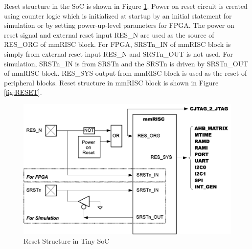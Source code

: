 Reset structure in the SoC is shown in Figure \ref{fig:RESETSOC}. Power on reset circuit is created using counter logic which is initialized at startup by an initial statement for simulation or by setting power-up-level parameters for FPGA. The power on reset signal and external reset input RES\_N are used as the source of RES\_ORG of mmRISC block. For FPGA, SRSTn\_IN of mmRISC block is simply from external reset input RES\_N and SRSTn\_OUT is not used. For simulation, SRSTn\_IN is from SRSTn and the SRSTn is driven by SRSTn\_OUT of mmRISC block. RES\_SYS output from mmRISC block is used as the reset of peripheral blocks. Reset structure in mmRISC block is shown in Figure \ref{fig:RESET}.

\begin{figure}[H]
    \includegraphics[width=1.00\columnwidth]{./Figure/ResetSoC.png}
    \caption{Reset Structure in Tiny SoC}
    \label{fig:RESETSOC}
\end{figure}

